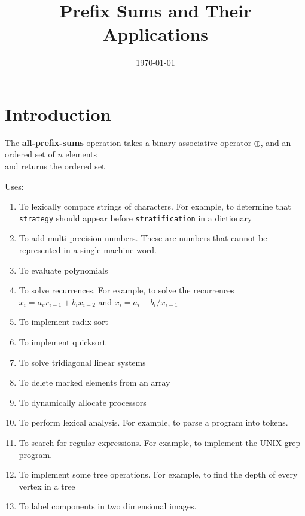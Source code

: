 \documentclass[11pt]{article}
\date{\today}
\title{Prefix Sums and Their Applications}
\begin{document}
\maketitle
\section{Introduction}
\label{sec:org5459166}
\begin{definition}[]
The \textbf{all-prefix-sums} operation takes a binary associative operator \(\oplus\), and an ordered set of
\(n\) elements
\begin{equation*}
[a_0,a_1,\dots,a_{n-1}]
\end{equation*}
and returns the ordered set
\begin{equation*}
[a_0, (a_0\oplus a_1),\dots,(a_0\oplus a_2\oplus\cdots\oplus a_{n-1})]
\end{equation*}
\end{definition}

Uses:
\begin{enumerate}
\item To lexically compare strings of characters. For example, to determine that \texttt{strategy} should appear
before \texttt{stratification} in a dictionary
\item To add multi precision numbers. These are numbers that cannot be represented in a single machine word.
\item To evaluate polynomials
\item To solve recurrences. For example, to solve the recurrences \(x_i=a_ix_{i-1}+b_ix_{i-2}\) and
\(x_i=a_i+b_i/x_{i-1}\)
\item To implement radix sort
\item To implement quicksort
\item To solve tridiagonal linear systems
\item To delete marked elements from an array
\item To dynamically allocate processors
\item To perform lexical analysis. For example, to parse a program into tokens.
\item To search for regular expressions. For example, to implement the UNIX grep program.
\item To implement some tree operations. For example, to find the depth of every vertex in a tree
\item To label components in two dimensional images.
\end{enumerate}
\end{document}
